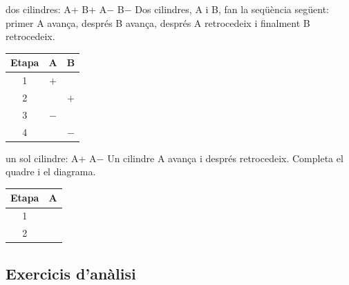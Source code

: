 \begin{exemple}{dos cilindres: A+ B+ A$-$ B$-$}
Dos cilindres, A i B, fan la seqüència següent: primer A avança, després B avança, després A retrocedeix i finalment B retrocedeix.
\begin{center}
\renewcommand{\arraystretch}{1.3}
\begin{tabular}{c|cc}
\textbf{Etapa} & \textbf{A} & \textbf{B}\\\hline
1 & $+$ & \\
2 & & $+$\\
3 & $-$ & \\
4 & & $-$
\end{tabular}\qquad\qquad
{}
\end{center}
\end{exemple}

\begin{guiada}{un sol cilindre: A+ A$-$}
Un cilindre A avança i després retrocedeix. Completa el quadre i el diagrama.
\begin{center}
\renewcommand{\arraystretch}{1.8}
\begin{tabular}{c|c}
\textbf{Etapa} & \textbf{A}\\\hline
1 & \hspace{1.2cm}\\\hline
2 & \hspace{1.2cm}\\
\end{tabular}\qquad\qquad
{}
\end{center}
\end{guiada}

\subsection*{Exercicis d'anàlisi}

\newcommand{\circuitD}{%
\begin{tikzpicture}[x=1cm,y=1cm]
 \pnbutton{s1}{0}{0.3}
 \pnbutton{s2}{3.4}{0.3}
 \pnand{2.4}{2.6}
 \pncyl{a}{2.15}{4.35}{s}
 \draw[pn] (s1-2)--(1.35,2.6)--(1.7,2.6);
 \draw[pn] (s2-2)--(4.75,2.6)--(3.1,2.6);
 \draw[pn] (2.4,3.2)--(a-A);
 \draw[pn] (s1-1)--(1.125,-.6) (s2-1)--(4.525,-.6) (-.2,-.6)--(4.525,-.6);
 \pnsource{-.2}{-.6}{0}
 \pntag{-.7}{-1.0}{0Z1}\pntag{-.7}{.75}{1S1}\pntag{2.7}{.75}{1S2}\pntag{.8}{3.1}{1V1}\pntag{6.3}{4.7}{1A1}
\end{tikzpicture}}

